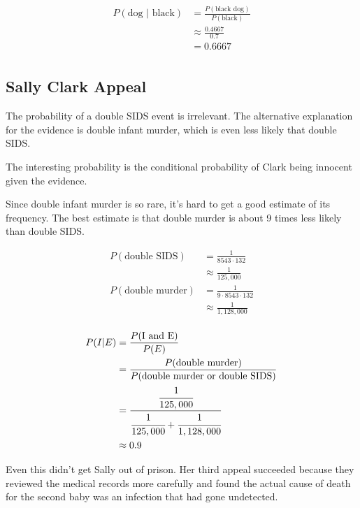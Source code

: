 \documentclass[letterpaper, landscape]{exam}
\begin{document}
  \begin{align*}
    P(\text{dog } | \text{ black}) & = \frac{P(\text{black dog})}{P(\text{black})} \\
                                   & \approx \frac{0.4667}{0.7} \\
                                   & = 0.6667 \\
  \end{align*}

  \subsection{Sally Clark Appeal}
  The probability of a double SIDS event is irrelevant. The alternative
  explanation for the evidence is double infant murder, which is even less
  likely that double SIDS\@. 
  
  The interesting probability is the conditional probability of Clark being
  innocent given the evidence.

  Since double infant murder is so rare, it's hard to get a good estimate of its
  frequency. The best estimate is that double murder is about 9 times less
  likely than double SIDS\@.

  \begin{align*}
    P(\text{double SIDS}) & = \frac{1}{8543 \cdot 132} \\
                            & \approx \frac{1}{125,000} \\
    P(\text{double murder}) & = \frac{1}{9 \cdot 8543 \cdot 132} \\
                            & \approx \frac{1}{1,128,000} \\
  \end{align*}

  \begin{align*}
    P(I | E) & = \frac{P(\text{I and E})}{P(E)} \\
             & = \frac{P(\text{double murder})}{P(\text{double murder or double SIDS})} \\
             & = \frac{\cfrac{1}{125,000}}{\cfrac{1}{125,000} + \cfrac{1}{1,128,000}} \\
             & \approx 0.9 \\
  \end{align*}

  Even this didn't get Sally out of prison. Her third appeal succeeded because
  they reviewed the medical records more carefully and found the actual cause of
  death for the second baby was an infection that had gone undetected.
\end{document}
